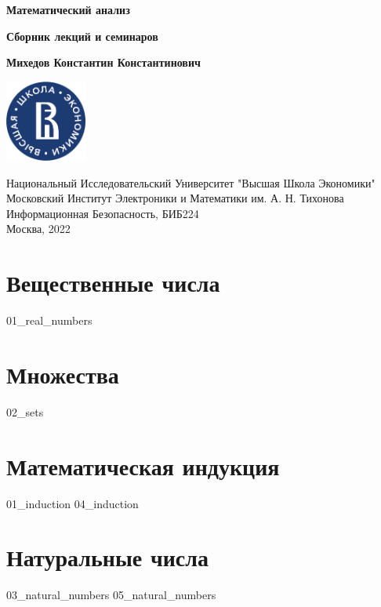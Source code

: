 \documentclass[a4paper,12pt]{article}
\begin{document}
  \begin{titlepage}
    \begin{center}
      \vspace*{1.5cm}

      \Huge
      \textbf{Математический анализ}

      \vspace{0.5cm} \large
      \textbf{Сборник лекций и семинаров}

      \vspace{1.5cm} \normalsize
      \textbf{Михедов Константин Константинович}

      \vfill

      \includegraphics[width=0.2\textwidth]{hse_logo}

      \vspace{1cm} \footnotesize
      Национальный Исследовательский Университет "Высшая Школа Экономики" \\
      Московский Институт Электроники и Математики им. А. Н. Тихонова \\
      Информационная Безопасность, БИБ224 \\
      Москва, 2022
    \end{center}
  \end{titlepage}

  \section{Вещественные числа}
  {01_real_numbers}

  \section{Множества}
  {02_sets}

  \section{Математическая индукция}
  {01_induction}
  {04_induction}

  \section{Натуральные числа}
  {03_natural_numbers}
  {05_natural_numbers}
\end{document}
